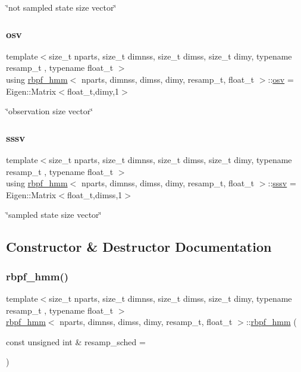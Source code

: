 \char`\"{}not sampled state size vector\char`\"{} \mbox{\label{classrbpf__hmm_adafd37687fdd3bb776d3d33a5b0e7080}} 
\subsubsection{\texorpdfstring{osv}{osv}}
{\footnotesize\ttfamily template$<$size\+\_\+t nparts, size\+\_\+t dimnss, size\+\_\+t dimss, size\+\_\+t dimy, typename resamp\+\_\+t , typename float\+\_\+t $>$ \\
using \hyperlink{classrbpf__hmm}{rbpf\+\_\+hmm}$<$ nparts, dimnss, dimss, dimy, resamp\+\_\+t, float\+\_\+t $>$\+::\hyperlink{classrbpf__hmm_adafd37687fdd3bb776d3d33a5b0e7080}{osv} =  Eigen\+::\+Matrix$<$float\+\_\+t,dimy,1$>$}

\char`\"{}observation size vector\char`\"{} \mbox{\label{classrbpf__hmm_a28e8ad1d93bcf53cb74603f74826a81c}} 
\subsubsection{\texorpdfstring{sssv}{sssv}}
{\footnotesize\ttfamily template$<$size\+\_\+t nparts, size\+\_\+t dimnss, size\+\_\+t dimss, size\+\_\+t dimy, typename resamp\+\_\+t , typename float\+\_\+t $>$ \\
using \hyperlink{classrbpf__hmm}{rbpf\+\_\+hmm}$<$ nparts, dimnss, dimss, dimy, resamp\+\_\+t, float\+\_\+t $>$\+::\hyperlink{classrbpf__hmm_a28e8ad1d93bcf53cb74603f74826a81c}{sssv} =  Eigen\+::\+Matrix$<$float\+\_\+t,dimss,1$>$}

\char`\"{}sampled state size vector\char`\"{} 

\subsection{Constructor \& Destructor Documentation}
\mbox{\label{classrbpf__hmm_a39295fbe6066714572219c4544ba2940}} 
\subsubsection{\texorpdfstring{rbpf\+\_\+hmm()}{rbpf\_hmm()}}
{\footnotesize\ttfamily template$<$size\+\_\+t nparts, size\+\_\+t dimnss, size\+\_\+t dimss, size\+\_\+t dimy, typename resamp\+\_\+t , typename float\+\_\+t $>$ \\
\hyperlink{classrbpf__hmm}{rbpf\+\_\+hmm}$<$ nparts, dimnss, dimss, dimy, resamp\+\_\+t, float\+\_\+t $>$\+::\hyperlink{classrbpf__hmm}{rbpf\+\_\+hmm} (\begin{DoxyParamCaption}\item[{const unsigned int \&}]{resamp\+\_\+sched = {} }\end{DoxyParamCaption})}



